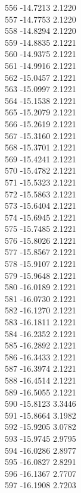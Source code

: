 \documentclass[11pt]{article}
\theoremstyle{definition}
\theoremstyle{plain}
\begin{document}
{556 -14.7213 2.1220\\
557 -14.7753 2.1220\\
558 -14.8294 2.1220\\
559 -14.8835 2.1221\\
560 -14.9375 2.1221\\
561 -14.9916 2.1221\\
562 -15.0457 2.1221\\
563 -15.0997 2.1221\\
564 -15.1538 2.1221\\
565 -15.2079 2.1221\\
566 -15.2619 2.1221\\
567 -15.3160 2.1221\\
568 -15.3701 2.1221\\
569 -15.4241 2.1221\\
570 -15.4782 2.1221\\
571 -15.5323 2.1221\\
572 -15.5863 2.1221\\
573 -15.6404 2.1221\\
574 -15.6945 2.1221\\
575 -15.7485 2.1221\\
576 -15.8026 2.1221\\
577 -15.8567 2.1221\\
578 -15.9107 2.1221\\
579 -15.9648 2.1221\\
580 -16.0189 2.1221\\
581 -16.0730 2.1221\\
582 -16.1270 2.1221\\
583 -16.1811 2.1221\\
584 -16.2352 2.1221\\
585 -16.2892 2.1221\\
586 -16.3433 2.1221\\
587 -16.3974 2.1221\\
588 -16.4514 2.1221\\
589 -16.5055 2.1221\\
590 -15.8123 3.3446\\
591 -15.8664 3.1982\\
592 -15.9205 3.0782\\
593 -15.9745 2.9795\\
594 -16.0286 2.8977\\
595 -16.0827 2.8291\\
596 -16.1367 2.7707\\
597 -16.1908 2.7203\\
}
\end{document}
